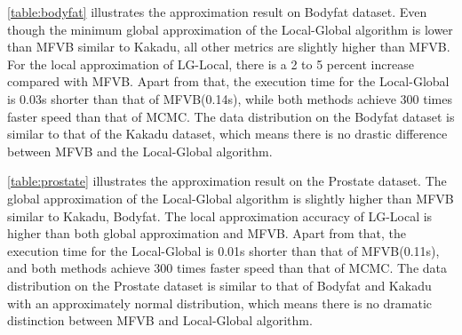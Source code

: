 \autoref{table:bodyfat} illustrates the approximation result on Bodyfat dataset. Even though the minimum global approximation of the Local-Global algorithm is lower than MFVB similar to Kakadu, all other metrics are slightly higher than MFVB. For the local approximation of LG-Local, there is a 2 to 5 percent increase compared with MFVB. Apart from that, the execution time for the Local-Global is 0.03s shorter than that of MFVB(0.14s), while both methods achieve 300 times faster speed than that of MCMC.
The data distribution on the Bodyfat dataset is similar to that of the Kakadu dataset, which means there is no drastic difference between MFVB and the Local-Global algorithm.\\
\begin{table}[!h]
	\caption{Experiment Result on Prostate dataset}
	\label{table:prostate}
\end{table}
\autoref{table:prostate} illustrates the approximation result on the Prostate dataset.  The global approximation of the Local-Global algorithm is slightly higher than MFVB similar to Kakadu, Bodyfat. The local approximation accuracy of LG-Local is higher than both global approximation and MFVB. Apart from that, the execution time for the Local-Global is 0.01s shorter than that of MFVB(0.11s), and both methods achieve 300 times faster speed than that of MCMC.
The data distribution on the Prostate dataset is similar to that of Bodyfat and Kakadu with an approximately normal distribution, which means there is no dramatic distinction between MFVB and Local-Global algorithm.\\
